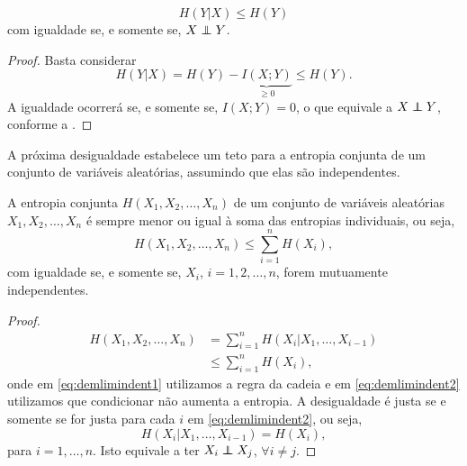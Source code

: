 \begin{theorem}\label{thm:condnaoaumentaentropia}
\begin{equation}
  H(Y|X) \leq H(Y)
\end{equation}
com igualdade se, e somente se, $X \independent Y$.
\end{theorem}
\begin{proof}
  Basta considerar
  \begin{equation}
    H(Y|X) = H(Y) - \underbrace{ I(X;Y) }_{\geq 0} \leq H(Y) .
  \end{equation}
  A igualdade ocorrerá se, e somente se, $I(X;Y) = 0$, o que equivale a $X \independent Y$,
  conforme a .
\end{proof}



A próxima desigualdade estabelece um teto para a entropia conjunta de um conjunto de variáveis aleatórias, assumindo que elas são independentes.
\begin{theorem}\label{thm:limindent}
  A entropia conjunta $H(X_1, X_2, \ldots, X_n)$ de um conjunto de variáveis aleatórias $X_1, X_2, \ldots, X_n$
  é sempre menor ou igual à soma das entropias individuais, ou seja,
  \begin{equation}
    H(X_1, X_2, \ldots, X_n) \leq \sum_{i=1}^n H(X_i) ,
  \end{equation}
  com igualdade se, e somente se, $X_i$, $i=1,2,\ldots,n$, forem mutuamente independentes.
\end{theorem}
\begin{proof}
  \begin{subequations}\label{eq:demlimindent}
    \begin{align}
      H(X_1, X_2, \ldots, X_n) &= \sum_{i=1}^n H(X_i|X_1,\ldots,X_{i-1}) \label{eq:demlimindent1}\\
                               &\leq \sum_{i=1}^n H(X_i) ,\label{eq:demlimindent2}
    \end{align}
  \end{subequations}
  onde em \ref{eq:demlimindent1} utilizamos a regra da cadeia e
  em \ref{eq:demlimindent2} utilizamos que condicionar não aumenta a entropia.
  A desigualdade é justa se e somente se for justa para cada $i$ em \ref{eq:demlimindent2}, ou seja,
  \begin{equation}
    H(X_i|X_1,\ldots,X_{i-1}) = H(X_i) ,
  \end{equation}
  para $i=1,\ldots,n$. Isto equivale a ter $X_i \independent X_j$, $\forall i \neq j$.
\end{proof}




